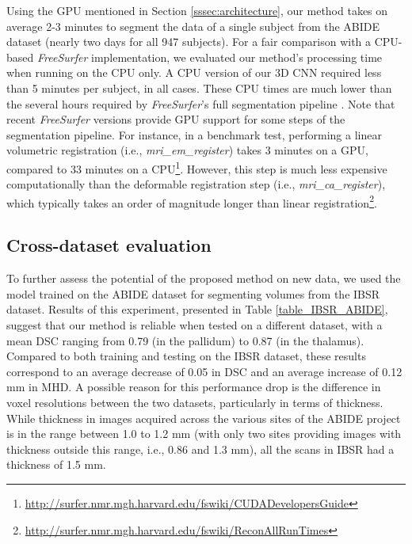 \documentclass[twoside,fleqn,espcrc2]{elsarticle}
\newcommand{\FreeSurfer}{\textit{FreeSurfer}}
\begin{document}
Using the GPU mentioned in Section \ref{sssec:architecture}, our method takes on average 2-3 minutes to segment the data of a single subject from the ABIDE dataset (nearly two days for all 947 subjects). For a fair comparison with a CPU-based \FreeSurfer{} implementation, we evaluated our method's processing time when running on the CPU only. A CPU version of our 3D CNN required less than 5 minutes per subject, in all cases. These CPU times are much lower than the several hours required by
\FreeSurfer{}'s full segmentation pipeline \cite{khan2008freesurfer,huo2016consistent}. Note that recent \FreeSurfer{} versions provide GPU support for some steps of the segmentation pipeline. For instance, in a benchmark test, performing a linear volumetric registration (i.e., \textit{mri\_em\_register}) takes 3 minutes on a GPU, compared to 33 minutes on a CPU\footnote{\url{http://surfer.nmr.mgh.harvard.edu/fswiki/CUDADevelopersGuide}}. However, this step is much less expensive computationally than the deformable registration step (i.e., \textit{mri\_ca\_register}), which typically takes an order of magnitude longer than linear registration\footnote{\url{http://surfer.nmr.mgh.harvard.edu/fswiki/ReconAllRunTimes}}.


\subsection{Cross-dataset evaluation}
\label{ssec:IBSR_ABIDE}

To further assess the potential of the proposed method on new data, we used the model trained on the ABIDE dataset for segmenting volumes from the IBSR dataset. Results of this experiment, presented in Table \ref{table_IBSR_ABIDE}, suggest that our method is reliable when tested on a different dataset, with a mean DSC ranging from 0.79 (in the pallidum) to 0.87 (in the thalamus). Compared to both training and testing on the IBSR dataset, these results correspond to an average decrease of 0.05 in DSC and an average increase of 0.12 mm in MHD. A possible reason for this performance drop is the difference in voxel resolutions between the two datasets, particularly in terms of thickness. While thickness in images acquired across the various sites of the ABIDE project is in the range between 1.0 to 1.2 mm (with only two sites providing images with thickness outside this range, i.e., 0.86 and 1.3 mm), all the scans in IBSR had a thickness of 1.5 mm.
\end{document}
